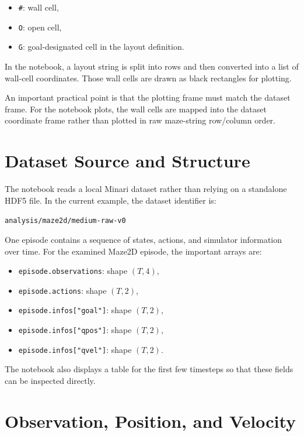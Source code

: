 \documentclass[12pt]{article}
\begin{document}
\begin{itemize}[leftmargin=*]
\item \texttt{\#}: wall cell,
\item \texttt{O}: open cell,
\item \texttt{G}: goal-designated cell in the layout definition.
\end{itemize}

In the notebook, a layout string is split into rows and then converted into a list of wall-cell coordinates. Those wall cells are drawn as black rectangles for plotting.

An important practical point is that the plotting frame must match the dataset frame. For the notebook plots, the wall cells are mapped into the dataset coordinate frame rather than plotted in raw maze-string row/column order.

\section*{Dataset Source and Structure}

The notebook reads a local Minari dataset rather than relying on a standalone HDF5 file. In the current example, the dataset identifier is:

\begin{center}
\texttt{analysis/maze2d/medium-raw-v0}
\end{center}

One episode contains a sequence of states, actions, and simulator information over time. For the examined Maze2D episode, the important arrays are:

\begin{itemize}[leftmargin=*]
\item \texttt{episode.observations}: shape \((T,4)\),
\item \texttt{episode.actions}: shape \((T,2)\),
\item \texttt{episode.infos["goal"]}: shape \((T,2)\),
\item \texttt{episode.infos["qpos"]}: shape \((T,2)\),
\item \texttt{episode.infos["qvel"]}: shape \((T,2)\).
\end{itemize}

The notebook also displays a table for the first few timesteps so that these fields can be inspected directly.

\section*{Observation, Position, and Velocity}
\end{document}
